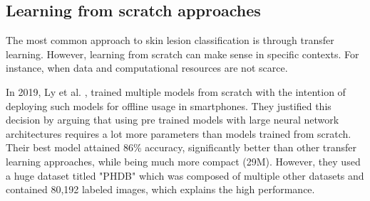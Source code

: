 \subsection{Learning from scratch approaches}
    The most common approach to skin lesion classification is through transfer learning. However, learning from scratch can make sense in specific contexts. For instance, when data and computational resources are not scarce. \par 
    In 2019, Ly et al. \cite{Ly2019}, trained multiple models from scratch with the intention of deploying such models for offline usage in smartphones. They justified this decision by arguing that using pre trained models with large neural network architectures requires a lot more parameters than models trained from scratch. Their best model attained 86\% accuracy, significantly better than other transfer learning approaches, while being much more compact (29M). However, they used a huge dataset titled "PHDB" which was composed of multiple other datasets and contained 80,192 labeled images, which explains the high performance.

